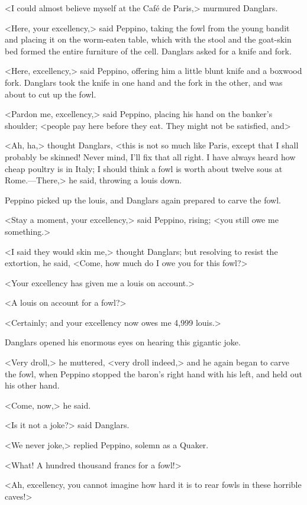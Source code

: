  <I could almost believe myself at the Café de Paris,> murmured Danglars. 

 <Here, your excellency,> said Peppino, taking the fowl from the young bandit and placing it on the worm-eaten table, which with the stool and the goat-skin bed formed the entire furniture of the cell. Danglars asked for a knife and fork. 

 <Here, excellency,> said Peppino, offering him a little blunt knife and a boxwood fork. Danglars took the knife in one hand and the fork in the other, and was about to cut up the fowl. 

 <Pardon me, excellency,> said Peppino, placing his hand on the banker's shoulder; <people pay here before they eat. They might not be satisfied, and\longdash> 

 <Ah, ha,> thought Danglars, <this is not so much like Paris, except that I shall probably be skinned! Never mind, I'll fix that all right. I have always heard how cheap poultry is in Italy; I should think a fowl is worth about twelve sous at Rome.—There,> he said, throwing a louis down. 

 Peppino picked up the louis, and Danglars again prepared to carve the fowl. 

 <Stay a moment, your excellency,> said Peppino, rising; <you still owe me something.> 

 <I said they would skin me,> thought Danglars; but resolving to resist the extortion, he said, <Come, how much do I owe you for this fowl?> 

 <Your excellency has given me a louis on account.> 

 <A louis on account for a fowl?> 

 <Certainly; and your excellency now owes me 4,999 louis.> 

 Danglars opened his enormous eyes on hearing this gigantic joke. 

 <Very droll,> he muttered, <very droll indeed,> and he again began to carve the fowl, when Peppino stopped the baron's right hand with his left, and held out his other hand. 

 <Come, now,> he said. 

 <Is it not a joke?> said Danglars. 

 <We never joke,> replied Peppino, solemn as a Quaker. 

 <What! A hundred thousand francs for a fowl!> 

 <Ah, excellency, you cannot imagine how hard it is to rear fowls in these horrible caves!> 

